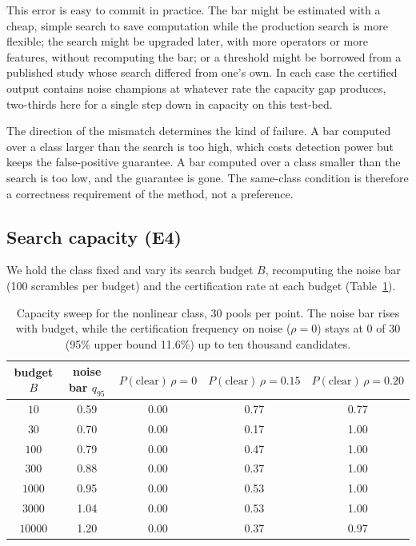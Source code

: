 \documentclass[11pt]{article}
\begin{document}
This error is easy to commit in practice. The bar might be estimated with a cheap, simple search to save
computation while the production search is more flexible; the search might be upgraded later, with more
operators or more features, without recomputing the bar; or a threshold might be borrowed from a
published study whose search differed from one's own. In each case the certified output contains noise
champions at whatever rate the capacity gap produces, two-thirds here for a single step down in
capacity on this test-bed.

The direction of the mismatch determines the kind of failure. A bar computed over a class larger than
the search is too high, which costs detection power but keeps the false-positive guarantee. A bar
computed over a class smaller than the search is too low, and the guarantee is gone. The same-class
condition is therefore a correctness requirement of the method, not a preference.

\subsection{Search capacity (E4)}
\label{sec:e4}

We hold the class fixed and vary its search budget $B$, recomputing the noise bar (100 scrambles per
budget) and the certification rate at each budget (Table~\ref{tab:capacity}).

\begin{table}[htbp]
\centering
\caption{Capacity sweep for the nonlinear class, 30 pools per point. The noise bar rises with budget,
while the certification frequency on noise ($\rho=0$) stays at 0 of 30 (95\% upper bound 11.6\%) up to
ten thousand candidates.}
\label{tab:capacity}
\small
\begin{tabular}{c c c c c}
\toprule
budget $B$ & noise bar $q_{95}$ & $P(\text{clear})\,\rho{=}0$ & $P(\text{clear})\,\rho{=}0.15$ & $P(\text{clear})\,\rho{=}0.20$ \\
\midrule
$10$     & 0.59 & 0.00 & 0.77 & 0.77 \\
$30$     & 0.70 & 0.00 & 0.17 & 1.00 \\
$100$    & 0.79 & 0.00 & 0.47 & 1.00 \\
$300$    & 0.88 & 0.00 & 0.37 & 1.00 \\
$1000$   & 0.95 & 0.00 & 0.53 & 1.00 \\
$3000$   & 1.04 & 0.00 & 0.53 & 1.00 \\
$10000$  & 1.20 & 0.00 & 0.37 & 0.97 \\
\bottomrule
\end{tabular}
\end{table}
\end{document}
